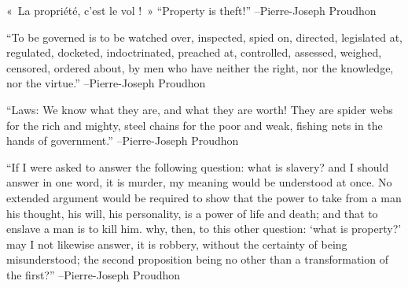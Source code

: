 \documentclass{article}%
\begin{document}
\linebreak%
\vspace{1mm}%
\begin{minipage}{\textwidth}%
\flushleft%
«~La propriété, c'est le vol !~»%
\linebreak%
\vspace{1mm}%
“Property is theft!”%
\linebreak%
–Pierre{-}Joseph Proudhon%
\linebreak%
\vspace{1mm}%
\end{minipage}%
\linebreak%
\vspace{1mm}%
\begin{minipage}{\textwidth}%
\flushleft%
“To be governed is to be watched over, inspected, spied on, directed, legislated at, regulated, docketed, indoctrinated, preached at, controlled, assessed, weighed, censored, ordered about, by men who have neither the right, nor the knowledge, nor the virtue.”%
\linebreak%
\vspace{1mm}%
–Pierre{-}Joseph Proudhon%
\linebreak%
\vspace{1mm}%
\end{minipage}%
\linebreak%
\vspace{1mm}%
\begin{minipage}{\textwidth}%
\flushleft%
“Laws: We know what they are, and what they are worth! They are spider webs for the rich and mighty, steel chains for the poor and weak, fishing nets in the hands of government.”%
\linebreak%
\vspace{1mm}%
–Pierre{-}Joseph Proudhon%
\linebreak%
\vspace{1mm}%
\end{minipage}%
\linebreak%
\vspace{1mm}%
\begin{minipage}{\textwidth}%
\flushleft%
“If I were asked to answer the following question: what is slavery? and I should answer in one word, it is murder, my meaning would be understood at once. No extended argument would be required to show that the power to take from a man his thought, his will, his personality, is a power of life and death; and that to enslave a man is to kill him. why, then, to this other question: ‘what is property?’ may I not likewise answer, it is robbery, without the certainty of being misunderstood; the second proposition being no other than a transformation of the first?”%
\linebreak%
\vspace{1mm}%
–Pierre{-}Joseph Proudhon%
\linebreak%
\vspace{1mm}%
\end{minipage}%
\end{document}
